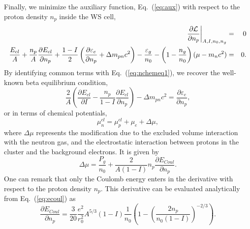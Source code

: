 Finally, we minimize the auxiliary function, Eq.~(\ref{eq:aux}) with respect to
the proton density $n_p$ inside the WS cell,
%
\begin{eqnarray}
  \frac{\partial \mathcal{L}}{\partial n_p}\bigg|_{A,I,n_0,n_g} &=& 0 \notag\\
  \frac{E_{cl}}{A} + \frac{n_p}{A}\frac{\partial E_{cl}}{\partial n_p} +
  \frac{1-I}{2}\left(\frac{\partial \varepsilon_e}{\partial n_p} + \Delta
  m_{pn}c^2\right) - \frac{\varepsilon_g}{n_0} -
  \left(1-\frac{n_g}{n_0}\right)(\mu-m_nc^2) &=& 0. \notag\\
\end{eqnarray}
%
By identifying common terms with Eq.~(\ref{eq:nchemeq1}), we recover the 
well-known beta equilibrium condition,
%
\begin{equation}
  \frac{2}{A}\left(\frac{\partial E_{cl}}{\partial I} -
  \frac{n_p}{1-I}\frac{\partial E_{cl}}{\partial n_p}\right) - \Delta
  m_{pn}c^2 =
  \frac{\partial \varepsilon_e}{\partial n_p},
\end{equation}
%
or in terms of chemical potentials,
%
\begin{equation}
  \mu_n^{cl} = \mu_p^{cl} + \mu_e + \Delta \mu,\label{eq:betaeq}
\end{equation}
%
where $\Delta \mu$ represents the modification due to the excluded volume
interaction with the neutron gas, and the electrostatic interaction between
protons in the cluster and the background electrons. It is given by
%
\begin{equation}
  \Delta \mu = \frac{P_g}{n_0} + \frac{2}{A(1-I)}n_p\frac{\partial
  E_{Coul}}{\partial n_p}.
\end{equation}
%
One can remark that only the Coulomb energy enters in the derivative with
respect to the proton density $n_p$. This derivative can be evaluated
analytically from Eq.~(\ref{eq:ecoul}) as
%
\begin{equation}
  \frac{\partial E_{Coul}}{\partial n_p} =
  \frac{3}{20}\frac{e^2}{r_0^2}A^{5/3}(1-I)\frac{1}{n_0}
  \left(1-\left(\frac{2n_p}{n_0(1-I)}\right)^{-2/3}\right).
\end{equation}
%

